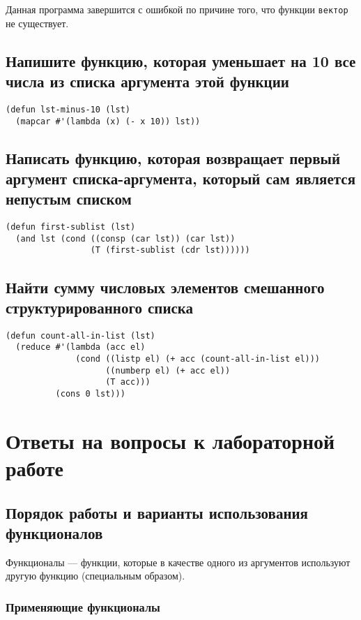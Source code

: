 Данная программа завершится с ошибкой по причине того, что функции \texttt{вектор} не существует.

\section{Напишите функцию, которая уменьшает на 10 все числа из списка аргумента этой функции}

\begin{lstlisting}
(defun lst-minus-10 (lst)
  (mapcar #'(lambda (x) (- x 10)) lst))
\end{lstlisting}

\section{Написать функцию, которая возвращает первый аргумент списка-аргумента, который сам является непустым списком}

\begin{lstlisting}
(defun first-sublist (lst)
  (and lst (cond ((consp (car lst)) (car lst))
                 (T (first-sublist (cdr lst))))))
\end{lstlisting}

\section{Найти сумму числовых элементов смешанного структурированного списка}

\begin{lstlisting}
(defun count-all-in-list (lst)
  (reduce #'(lambda (acc el)
              (cond ((listp el) (+ acc (count-all-in-list el)))
                    ((numberp el) (+ acc el))
                    (T acc)))
          (cons 0 lst)))
\end{lstlisting}

\chapter{Ответы на вопросы к лабораторной работе}

\section{Порядок работы и варианты использования функционалов}

Функционалы --- функции, которые в качестве одного из аргументов используют другую функцию (специальным образом).

\subsection{Применяющие функционалы} 

